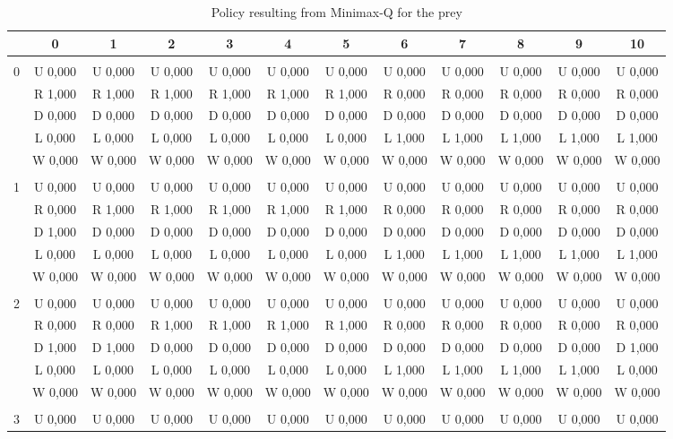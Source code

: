  \begin{table}[htbp]
\caption{Policy resulting from Minimax-Q for the prey}
\label{policyLabelPrey}
\centering
\begin{footnotesize}
\begin{tabular}{c|c|c|c|c|c|c|c|c|c|c|c|}
&0&1&2&3&4&5&6&7&8&9&10\\ \hline\\
0&U 0,000&U 0,000&U 0,000&U 0,000&U 0,000&U 0,000&U 0,000&U 0,000&U 0,000&U 0,000&U 0,000\\
&R 1,000&R 1,000&R 1,000&R 1,000&R 1,000&R 1,000&R 0,000&R 0,000&R 0,000&R 0,000&R 0,000\\
&D 0,000&D 0,000&D 0,000&D 0,000&D 0,000&D 0,000&D 0,000&D 0,000&D 0,000&D 0,000&D 0,000\\
&L 0,000&L 0,000&L 0,000&L 0,000&L 0,000&L 0,000&L 1,000&L 1,000&L 1,000&L 1,000&L 1,000\\
&W 0,000&W 0,000&W 0,000&W 0,000&W 0,000&W 0,000&W 0,000&W 0,000&W 0,000&W 0,000&W 0,000\\
\hline \\
1&U 0,000&U 0,000&U 0,000&U 0,000&U 0,000&U 0,000&U 0,000&U 0,000&U 0,000&U 0,000&U 0,000\\
&R 0,000&R 1,000&R 1,000&R 1,000&R 1,000&R 1,000&R 0,000&R 0,000&R 0,000&R 0,000&R 0,000\\
&D 1,000&D 0,000&D 0,000&D 0,000&D 0,000&D 0,000&D 0,000&D 0,000&D 0,000&D 0,000&D 0,000\\
&L 0,000&L 0,000&L 0,000&L 0,000&L 0,000&L 0,000&L 1,000&L 1,000&L 1,000&L 1,000&L 1,000\\
&W 0,000&W 0,000&W 0,000&W 0,000&W 0,000&W 0,000&W 0,000&W 0,000&W 0,000&W 0,000&W 0,000\\
\hline \\
2&U 0,000&U 0,000&U 0,000&U 0,000&U 0,000&U 0,000&U 0,000&U 0,000&U 0,000&U 0,000&U 0,000\\
&R 0,000&R 0,000&R 1,000&R 1,000&R 1,000&R 1,000&R 0,000&R 0,000&R 0,000&R 0,000&R 0,000\\
&D 1,000&D 1,000&D 0,000&D 0,000&D 0,000&D 0,000&D 0,000&D 0,000&D 0,000&D 0,000&D 1,000\\
&L 0,000&L 0,000&L 0,000&L 0,000&L 0,000&L 0,000&L 1,000&L 1,000&L 1,000&L 1,000&L 0,000\\
&W 0,000&W 0,000&W 0,000&W 0,000&W 0,000&W 0,000&W 0,000&W 0,000&W 0,000&W 0,000&W 0,000\\
\hline \\
3&U 0,000&U 0,000&U 0,000&U 0,000&U 0,000&U 0,000&U 0,000&U 0,000&U 0,000&U 0,000&U 0,000\\

\end{tabular}
\end{footnotesize}
\end{table}

